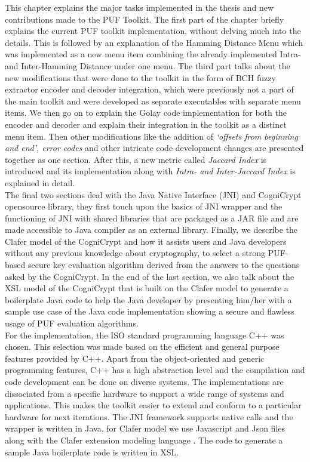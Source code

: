 This chapter explains the major tasks implemented in the thesis and new contributions made to the PUF Toolkit. The first part of the chapter briefly explains the current PUF toolkit implementation, without delving much into the details. This is followed by an explanation of the Hamming Distance Menu which was implemented as a new menu item combining the already implemented Intra- and Inter-Hamming Distance under one menu. The third part talks about the new modifications that were
done to the toolkit in the form of BCH fuzzy extractor encoder and decoder integration, which were previously not a part of the main toolkit and were developed as separate executables
with separate menu items. We then go on to explain the Golay code implementation for both the encoder and decoder and explain their integration in the toolkit as a distinct menu item. Then other modifications like the addition of \emph{`offsets from beginning and end', error codes} and other intricate code development changes are presented together as one section. After this, a new metric called \emph{Jaccard Index} is introduced and its implementation along with \emph{Intra- and
Inter-Jaccard Index} is explained in detail.\\

The final two sections deal with the Java Native Interface (JNI) and CogniCrypt opensource library, they first touch upon the basics of JNI
wrapper and the functioning of JNI with shared libraries that are packaged as a JAR file and are made accessible to Java compiler as an external library. Finally, we describe the Clafer model of the CogniCrypt and how it assists users and Java developers without any previous knowledge about cryptography, to select a strong PUF-based secure key evaluation algorithm derived from the answers to the questions asked by the CogniCrypt. In the end of the last section, we also talk about the XSL
model of the CogniCrypt that is built on
the Clafer model to generate a boilerplate Java code to help the Java developer by presenting him/her with a sample use case of the Java code implementation showing a secure and flawless usage of PUF evaluation algorithms.\\

For the implementation, the ISO standard programming language C++ was chosen. This selection was made based on the efficient and general purpose features provided by C++. Apart from the object-oriented and generic programming features, C++ has a high abstraction level and the compilation and code development can be done on diverse systems. The implementations are dissociated from a specific hardware to support a wide range of systems and applications. This makes the toolkit easier
to extend and conform to a particular hardware for next iterations. The JNI framework supports native calls and the wrapper is written in Java, for Clafer model we use Javascript and Json files along with the Clafer extension modeling language \cite{clafer}. The code to generate a sample Java boilerplate code is written in XSL.\\

